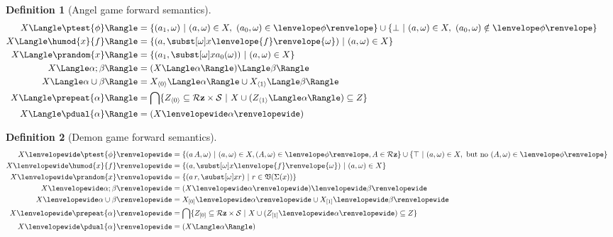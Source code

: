 \documentclass[12pt]{cmuthesis}
\theoremstyle{definition}
\newtheorem{definition}{Definition}
\theoremstyle{remark}
\newcommand{\allstate}{\mathcal{S}}
\newcommand{\om}{\omega}
\newcommand{\tint}[2]{\lenvelope{#1}\renvelope{#2}}
\begin{document}
\begin{definition}[Angel game forward semantics]
\begin{align*}
\strategyforR[\ptest{\phi}]{X}            &= \{(\rzSnd{\aa},\om)~|~ (\aa,\om) \in X,~(\rzFst{\aa},\om) \in \fintR{\phi}\}
                                                    \cup \{\sff~|~(\aa,\om) \in X,~(\rzFst{\aa},\om) \notin \fintR{\phi}\}\\ 
\strategyforR[\humod{x}{f}]{X}  &= \{(\aa,\ssub{\om}{x}{\tint{f}{\om}})~|~(\aa,\om) \in X\}&&\text{}\\ 
\strategyforR[\prandom{x}]{X}          &= \{(\rzSnd{\aa},\ssub{\om}{x}{\rzFst{\aa}(\om)})~|~(\aa,\om) \in X\}&&\text{}\\ 
\strategyforR[\alpha;\beta]{X}           &= \strategyforR[\beta]{(\strategyforR[\alpha]{X})} &&\text{}\\ 
\strategyforR[\alpha\cup\beta]{X}      &= \strategyforR[\alpha]{\apL{X}} \cup \strategyforR[\beta]{\apR{X}}&&\text{}\\
\strategyforR[\prepeat{\alpha}]{X}     &= \bigcap\{\apL{Z}\subseteq \allRz \times \allstate~|~ X \cup (\strategyforR[\alpha]{\apR{Z}}) \subseteq Z\}	
&&\\
\strategyforR[\pdual{\alpha}]{X}        &= (\dstrategyforR[\alpha]{X})&&\text{}
\end{align*}
\end{definition}
\begin{definition}[Demon game forward semantics]
\begin{align*}
\dstrategyforR[\ptest{\phi}]{X} &= \{(\rzApp{\aa}{\ab},\om)~|~(\aa,\om) \in X, (\ab,\om) \in \fintR{\phi}, \ab \in \allRz\}
                                                \cup \{\top~|~ (\aa,\om) \in X,\text{ but no } (\ab,\om) \in \fintR{\phi}\}&&\\
\dstrategyforR[\humod{x}{f}]{X} &= \{(\aa,\ssub{\om}{x}{\tint{f}{\om}})~|~(\aa,\om) \in X\} &&\text{}\\ 
\dstrategyforR[\prandom{x}]{X}     &= \{(\rzApp{\aa}{r},\ssub{\om}{x}{r})~|~r \in \valset{\Sigma(x)}\}&&\\ 
\dstrategyforR[\alpha;\beta]{X}       &= \dstrategyforR[\beta]{(\dstrategyforR[\alpha]{X})} &&\text{}\\ 
\dstrategyforR[\alpha\cup\beta]{X}  &= \dstrategyforR[\alpha]{\dpL{X}} \cup \dstrategyforR[\beta]{\dpR{X}} &&\text{}\\ 
\dstrategyforR[\prepeat{\alpha}]{X} &= \bigcap\{\dpL{Z}\subseteq \allRz \times \allstate~|~ X \cup (\dstrategyforR[\alpha]{\dpR{Z}}) \subseteq Z\}&&\\
\dstrategyforR[\pdual{\alpha}]{X}    &= (\strategyforR[\alpha]{X}) &&\text{}
\end{align*}
\end{definition}
\end{document}
